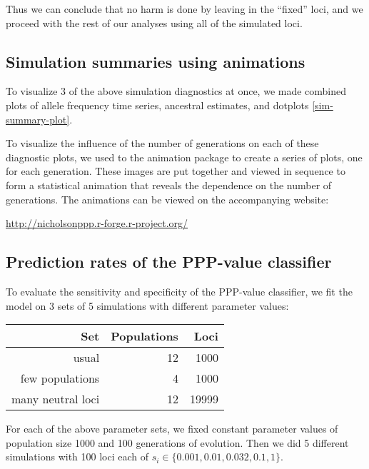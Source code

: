 \documentclass[a4paper,12pt]{article}
\begin{document}
Thus we can conclude that no harm is done by leaving in the ``fixed''
loci, and we proceed with the rest of our analyses using all of the
simulated loci.

\subsection{Simulation summaries using animations}


To visualize 3 of the above simulation diagnostics at once, we made
combined plots of allele frequency time series, ancestral estimates,
and dotplots \autoref{sim-summary-plot}.

To visualize the influence of the number of generations on each of
these diagnostic plots, we used to the animation
package\cite{animation} to create a series of plots, one for each
generation. These images are put together and viewed in sequence to
form a statistical animation that reveals the dependence on the number
of generations. The animations can be viewed on the accompanying
website:

 \url{http://nicholsonppp.r-forge.r-project.org/}

\subsection{Prediction rates of the PPP-value classifier}

To evaluate the sensitivity and specificity of the PPP-value
classifier, we fit the model on 3 sets of 5 simulations with different
parameter values:

\begin{tabular}{rrr}
  Set & Populations & Loci \\
  \hline
  usual & 12 & 1000 \\ %
  few populations & 4 & 1000\\   %
  many neutral loci & 12 & 19999   %
\end{tabular}

For each of the above parameter sets, we fixed constant parameter
values of population size 1000 and 100 generations of evolution. Then
we did 5 different simulations with 100 loci each of
$s_i\in\{0.001,0.01,0.032,0.1,1\}$.
\end{document}
